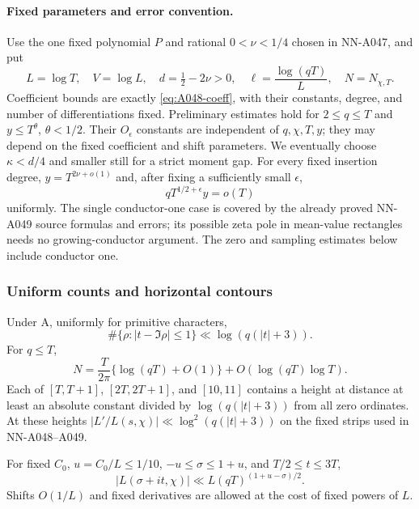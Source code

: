 \paragraph{Fixed parameters and error convention.}
Use the one fixed polynomial $P$ and rational $0<\nu<1/4$
chosen in NN-A047, and put
\[
 L=\log T,\quad V=\log L,\quad d=\tfrac12-2\nu>0,\quad
 \ell=\frac{\log(qT)}L,\quad N=N_{\chi,T}.
\tag{A049u.3}
\]
Coefficient bounds are exactly \eqref{eq:A048-coeff}, with their
constants, degree, and number of differentiations fixed.
Preliminary estimates hold for $2\le q\le T$ and $y\le T^\theta$,
$\theta<1/2$. Their $O_\epsilon$ constants are independent of
$q,\chi,T,y$; they may depend on the fixed coefficient and shift
parameters. We eventually choose $\kappa<d/4$ and smaller still
for a strict moment gap. For every fixed insertion degree,
$y=T^{2\nu+o(1)}$ and, after fixing a sufficiently small $\epsilon$,
\[
                     qT^{1/2+\epsilon}y=o(T)
\tag{A049u.4}
\]
uniformly. The single conductor-one case is covered by the already
proved NN-A049 source formulas and errors; its possible zeta pole
in mean-value rectangles needs no growing-conductor argument.
The zero and sampling estimates below include conductor one.

\subsubsection*{Uniform counts and horizontal contours}

\begin{lemma}
\label{lem:A049-uniform-counts}
Under A, uniformly for primitive characters,
\[
 \#\{\rho:|t-\Im\rho|\le1\}\ll\log(q(|t|+3)).
\tag{A049u.5}
\]
For $q\le T$,
\[
 N=\frac{T}{2\pi}\{\log(qT)+O(1)\}
                       +O(\log(qT)\log T).
\tag{A049u.6}
\]
Each of $[T,T+1]$, $[2T,2T+1]$, and $[10,11]$ contains
a height at distance at least an absolute constant divided by
$\log(q(|t|+3))$ from all zero ordinates. At these heights
$|L'/L(s,\chi)|\ll\log^2(q(|t|+3))$ on the fixed strips
used in NN-A048--A049.

For fixed $C_0$, $u=C_0/L\le1/10$,
$-u\le\sigma\le1+u$, and $T/2\le t\le3T$,
\[
 |L(\sigma+it,\chi)|\ll L(qT)^{(1+u-\sigma)/2}.
\tag{A049u.7}
\]
Shifts $O(1/L)$ and fixed derivatives are allowed at the
cost of fixed powers of $L$.
\end{lemma}

